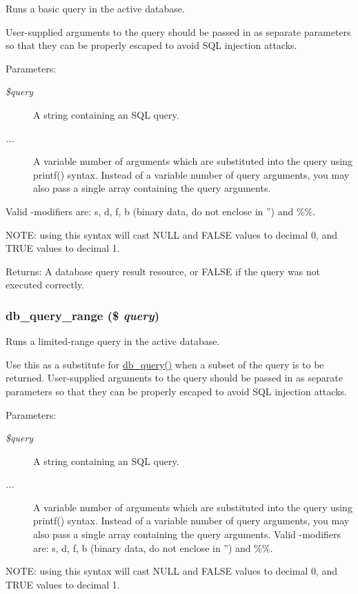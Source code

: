 Runs a basic query in the active database.

User-supplied arguments to the query should be passed in as separate parameters so that they can be properly escaped to avoid SQL injection attacks.

\begin{Desc}
\item[Parameters:]
\begin{description}
\item[{\em \$query}]A string containing an SQL query. \item[{\em ...}]A variable number of arguments which are substituted into the query using printf() syntax. Instead of a variable number of query arguments, you may also pass a single array containing the query arguments.\end{description}
\end{Desc}
Valid -modifiers are: s, d, f, b (binary data, do not enclose in '') and \%\%.

NOTE: using this syntax will cast NULL and FALSE values to decimal 0, and TRUE values to decimal 1.

\begin{Desc}
\item[Returns:]A database query result resource, or FALSE if the query was not executed correctly. \end{Desc}
\hypertarget{group__database_g893cbcab2ecf321005eae4e278adc22b}{
\subsubsection[{db\_\-query\_\-range}]{\setlength{\rightskip}{0pt plus 5cm}db\_\-query\_\-range (\$ {\em query})}}
\label{group__database_g893cbcab2ecf321005eae4e278adc22b}


Runs a limited-range query in the active database.

Use this as a substitute for \hyperlink{database_8mysql-common_8inc_9e096321b86945d128746ac7bedce8f3}{db\_\-query()} when a subset of the query is to be returned. User-supplied arguments to the query should be passed in as separate parameters so that they can be properly escaped to avoid SQL injection attacks.

\begin{Desc}
\item[Parameters:]
\begin{description}
\item[{\em \$query}]A string containing an SQL query. \item[{\em ...}]A variable number of arguments which are substituted into the query using printf() syntax. Instead of a variable number of query arguments, you may also pass a single array containing the query arguments. Valid -modifiers are: s, d, f, b (binary data, do not enclose in '') and \%\%.\end{description}
\end{Desc}
NOTE: using this syntax will cast NULL and FALSE values to decimal 0, and TRUE values to decimal 1.

